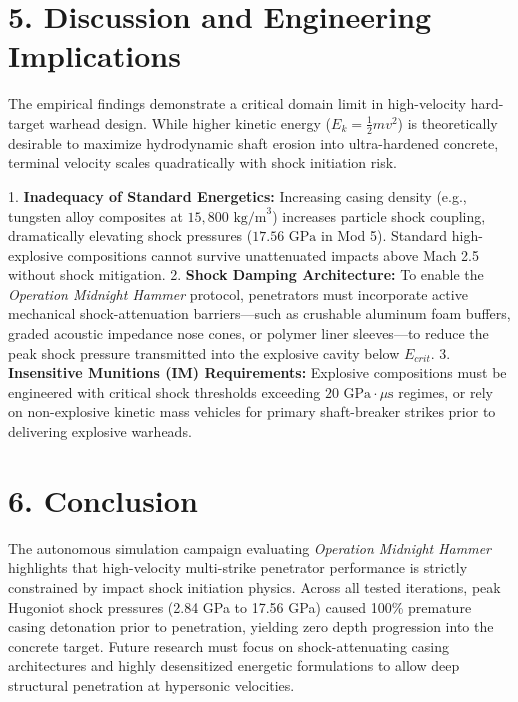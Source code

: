 \documentclass[journal,10pt,twocolumn]{IEEEtran}
\begin{document}
\section{5. Discussion and Engineering Implications}

The empirical findings demonstrate a critical domain limit in high-velocity hard-target warhead design. While higher kinetic energy ($E_k = \frac{1}{2}m v^2$) is theoretically desirable to maximize hydrodynamic shaft erosion into ultra-hardened concrete, terminal velocity scales quadratically with shock initiation risk.

1. \textbf{Inadequacy of Standard Energetics:} Increasing casing density (e.g., tungsten alloy composites at $15,800 \text{ kg/m}^3$) increases particle shock coupling, dramatically elevating shock pressures ($17.56 \text{ GPa}$ in Mod 5). Standard high-explosive compositions cannot survive unattenuated impacts above Mach 2.5 without shock mitigation.
2. \textbf{Shock Damping Architecture:} To enable the \emph{Operation Midnight Hammer} protocol, penetrators must incorporate active mechanical shock-attenuation barriers---such as crushable aluminum foam buffers, graded acoustic impedance nose cones, or polymer liner sleeves---to reduce the peak shock pressure transmitted into the explosive cavity below $E_{crit}$.
3. \textbf{Insensitive Munitions (IM) Requirements:} Explosive compositions must be engineered with critical shock thresholds exceeding $20 \text{ GPa} \cdot \mu\text{s}$ regimes, or rely on non-explosive kinetic mass vehicles for primary shaft-breaker strikes prior to delivering explosive warheads.



\section{6. Conclusion}

The autonomous simulation campaign evaluating \emph{Operation Midnight Hammer} highlights that high-velocity multi-strike penetrator performance is strictly constrained by impact shock initiation physics. Across all tested iterations, peak Hugoniot shock pressures (2.84 GPa to 17.56 GPa) caused 100\% premature casing detonation prior to penetration, yielding zero depth progression into the concrete target. Future research must focus on shock-attenuating casing architectures and highly desensitized energetic formulations to allow deep structural penetration at hypersonic velocities.
\end{document}
